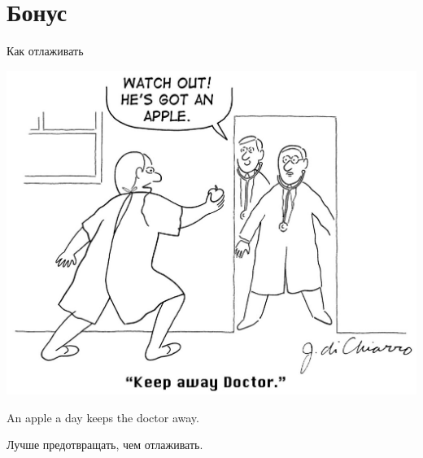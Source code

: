 \section{Бонус}

\begin{frame}
\end{frame}

\begin{frame}{Как отлаживать}
	\begin{center}
		\includegraphics[scale=0.2]{apple-a-day.jpg}
		\pause

		An apple a day keeps the doctor away.

		Лучше предотвращать, чем отлаживать.
	\end{center}
\end{frame}

